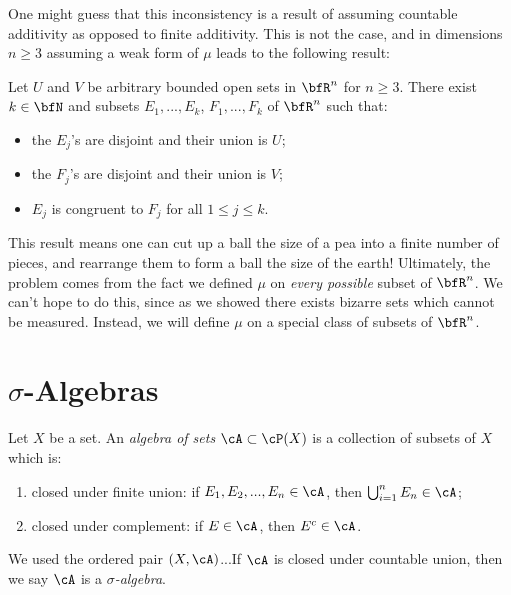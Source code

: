     One might guess that this inconsistency is a result of assuming countable additivity as opposed to finite additivity. This is not the case, and in dimensions $n \geq 3$ assuming a weak form of $\mu$ leads to the following result:
        \begin{theorem}
            Let $U$ and $V$ be arbitrary bounded open sets in $\bfR^n$ for $n \geq 3$. There exist $k \in \bfN$ and subsets $E_1,...,E_k$, $F_1,...,F_k$ of $\bfR^n$ such that:
                \begin{itemize}
                    \item the $E_j$'s are disjoint and their union is $U$;
                    \item the $F_j$'s are disjoint and their union is $V$;
                    \item $E_j$ is congruent to $F_j$ for all $1 \leq j \leq k$.
                \end{itemize}
        \end{theorem}
    This result means one can cut up a ball the size of a pea into a finite number of pieces, and rearrange them to form a ball the size of the earth! Ultimately, the problem comes from the fact we defined $\mu$ on \textit{every possible} subset of $\bfR^n$. We can't hope to do this, since as we showed there exists bizarre sets which cannot be measured. Instead, we will define $\mu$ on a special class of subsets of $\bfR^n$.

\section{$\sigma$-Algebras}
    \begin{definition}
        Let $X$ be a set. An \textit{algebra of sets} $\cA \subset \cP(X)$ is a collection of subsets of $X$ which is:
            \begin{enumerate}[label = (\arabic*),itemsep=1pt,topsep=3pt]
                \item closed under finite union: if $E_1,E_2,...,E_n \in \cA$, then $\bigcup_{i = 1}^n E_n \in \cA$;
                \item closed under complement: if $E \in \cA$, then $E^c \in \cA$.
            \end{enumerate}
        We used the ordered pair $(X,\cA)$...If $\cA$ is closed under countable union, then we say $\cA$ is a \textit{$\sigma$-algebra}.
    \end{definition}

